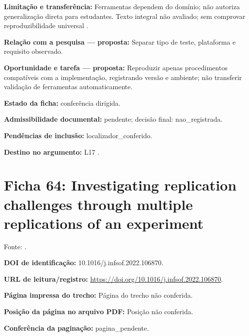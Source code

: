 \noindent\textbf{Limitação e transferência:} Ferramentas dependem do domínio; não autoriza generalização direta para estudantes. Texto integral não avaliado; sem comprovar reproduzibilidade universal \citep{eng11}.\par\medskip

\noindent\textbf{Relação com a pesquisa — proposta:} Separar tipo de teste, plataforma e requisito observado.\par\medskip

\noindent\textbf{Oportunidade e tarefa — proposta:} Reproduzir apenas procedimentos compatíveis com a implementação, registrando versão e ambiente; não transferir validação de ferramentas automaticamente.\par\medskip

\noindent\textbf{Estado da ficha:} conferência dirigida.\par\medskip

\noindent\textbf{Admissibilidade documental:} pendente; decisão final: nao\_registrada.\par\medskip

\noindent\textbf{Pendências de inclusão:} localizador\_conferido.\par\medskip

\noindent\textbf{Destino no argumento:} L17 .

\clearpage\section*{Ficha 64: Investigating replication challenges through multiple replications of an experiment}

Fonte: \citet{eng12}.

\noindent\textbf{DOI de identificação:} 10.1016/j.infsof.2022.106870.\par\medskip

\noindent\textbf{URL de leitura/registro:} \url{https://doi.org/10.1016/j.infsof.2022.106870}.\par\medskip

\noindent\textbf{Página impressa do trecho:} Página do trecho não conferida.\par\medskip

\noindent\textbf{Posição da página no arquivo PDF:} Posição não conferida.\par\medskip

\noindent\textbf{Conferência da paginação:} pagina\_pendente.\par\medskip

